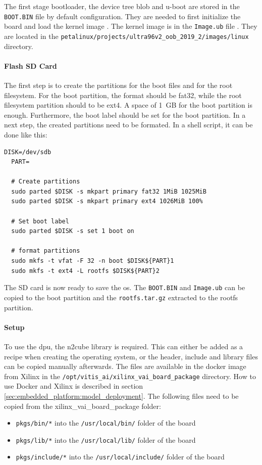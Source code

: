 The first stage bootloader, the device tree blob and u-boot are stored in the \texttt{BOOT.BIN} file by default configuration.
They are needed to first initialize the board and load the kernel image \cite{xilinx_wiki_boot}.
The kernel image is in the \texttt{Image.ub} file \cite{xilinx_wiki_uboot}.
They are located in the \texttt{petalinux/projects/ultra96v2\_oob\_2019\_2/images/linux} directory.

\paragraph{Flash SD Card}
The first step is to create the partitions for the boot files and for the root filesystem.
For the boot partition, the format should be fat32, while the root filesystem partition should to be ext4.
A space of \SI{1}{GB} for the boot partition is enough.
Furthermore, the boot label should be set for the boot partition.
In a next step, the created partitions need to be formated.
In a shell script, it can be done like this:

\begin{lstlisting}[style=bash, caption={Prepair SD card}, label=lst:create_partitions]
  DISK=/dev/sdb
  PART=

  # Create partitions
  sudo parted $DISK -s mkpart primary fat32 1MiB 1025MiB
  sudo parted $DISK -s mkpart primary ext4 1026MiB 100%

  # Set boot label
  sudo parted $DISK -s set 1 boot on

  # format partitions
  sudo mkfs -t vfat -F 32 -n boot $DISK${PART}1
  sudo mkfs -t ext4 -L rootfs $DISK${PART}2
\end{lstlisting}

The SD card is now ready to save the \acrshort{os}.
The \texttt{BOOT.BIN} and \texttt{Image.ub} can be copied to the boot partition and the \texttt{rootfs.tar.gz} extracted to the rootfs partition.

\paragraph{Setup}
To use the \acrshort{dpu}, the \acrshort{n2cube} library is required.
This can either be added as a recipe when creating the operating system, or the header, include and library files can be copied manually afterwards.
The files are available in the docker image from Xilinx in the \texttt{/opt/vitis\_ai/xilinx\_vai\_board\_package} directory.
How to use Docker and Xilinx is described in section \ref{sec:embedded_platform:model_deployment}.
The following files need to be copied from the xilinx\_vai\_board\_package folder:
\begin{itemize}
	\item \texttt{pkgs/bin/*} into the \texttt{/usr/local/bin/} folder of the board
	\item \texttt{pkgs/lib/*} into the \texttt{/usr/local/lib/} folder of the board
	\item \texttt{pkgs/include/*} into the \texttt{/usr/local/include/} folder of the board
\end{itemize}

